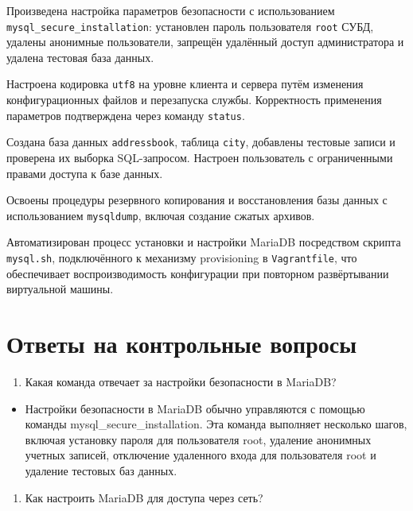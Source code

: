 \documentclass[
  12pt,
  a4paper,
  DIV=11,
  numbers=noendperiod]{scrreprt}
\providecommand{\tightlist}{%
  \setlength{\itemsep}{0pt}\setlength{\parskip}{0pt}}\usepackage{longtable,booktabs,array}
\begin{document}
Произведена настройка параметров безопасности с использованием
\texttt{mysql\_secure\_installation}: установлен пароль пользователя
\texttt{root} СУБД, удалены анонимные пользователи, запрещён удалённый
доступ администратора и удалена тестовая база данных.

Настроена кодировка \texttt{utf8} на уровне клиента и сервера путём
изменения конфигурационных файлов и перезапуска службы. Корректность
применения параметров подтверждена через команду \texttt{status}.

Создана база данных \texttt{addressbook}, таблица \texttt{city},
добавлены тестовые записи и проверена их выборка SQL-запросом. Настроен
пользователь с ограниченными правами доступа к базе данных.

Освоены процедуры резервного копирования и восстановления базы данных с
использованием \texttt{mysqldump}, включая создание сжатых архивов.

Автоматизирован процесс установки и настройки MariaDB посредством
скрипта \texttt{mysql.sh}, подключённого к механизму provisioning в
\texttt{Vagrantfile}, что обеспечивает воспроизводимость конфигурации
при повторном развёртывании виртуальной машины.

\chapter{Ответы на контрольные
вопросы}\label{ux43eux442ux432ux435ux442ux44b-ux43dux430-ux43aux43eux43dux442ux440ux43eux43bux44cux43dux44bux435-ux432ux43eux43fux440ux43eux441ux44b}

\begin{enumerate}
\def\labelenumi{\arabic{enumi}.}
\tightlist
\item
  Какая команда отвечает за настройки безопасности в MariaDB?
\end{enumerate}

\begin{itemize}
\tightlist
\item
  Настройки безопасности в MariaDB обычно управляются с помощью команды
  mysql\_secure\_installation. Эта команда выполняет несколько шагов,
  включая установку пароля для пользователя root, удаление анонимных
  учетных записей, отключение удаленного входа для пользователя root и
  удаление тестовых баз данных.
\end{itemize}

\begin{enumerate}
\def\labelenumi{\arabic{enumi}.}
\setcounter{enumi}{1}
\tightlist
\item
  Как настроить MariaDB для доступа через сеть?
\end{enumerate}
\end{document}
